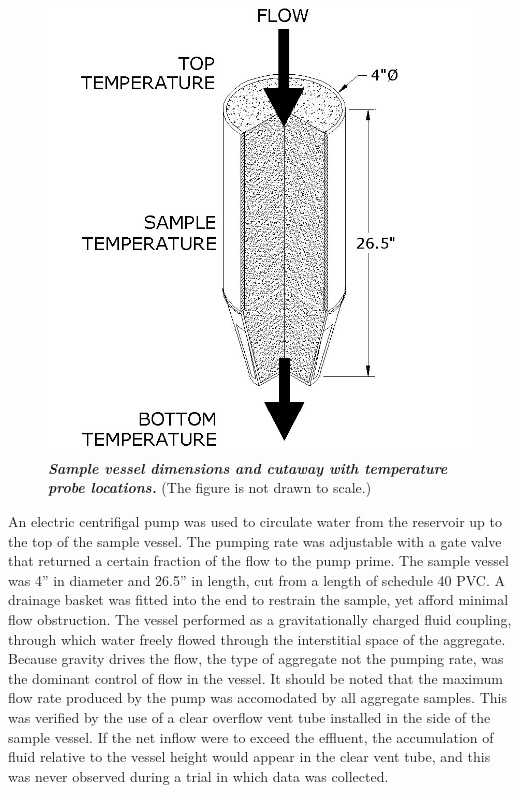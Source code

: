 \documentclass[12pt]{article}
\numberwithin{equation}{section}
\numberwithin{table}{section}
\numberwithin{figure}{section}
\begin{document}
\begin{figure}[h!]
\centering\includegraphics[scale=.35]{isoVessel.jpg}
\caption[Sample Vessel Cross Section]{\textbf{\emph{Sample vessel dimensions and cutaway with temperature probe locations.}} (The figure is not drawn to scale.)\label{isovessel}}
\end{figure}

An electric centrifigal pump was used to circulate water from the reservoir up to the top of the sample vessel. The pumping rate was adjustable with a gate valve that returned a certain fraction of the flow to the pump prime. The sample vessel was 4'' in diameter and 26.5'' in length, cut from a length of schedule 40 PVC. A drainage basket was fitted into the end to restrain the sample, yet afford minimal flow obstruction. The vessel performed as a gravitationally charged fluid coupling, through which water freely flowed through the interstitial space of the aggregate. Because gravity drives the flow, the type of aggregate not the pumping rate, was the dominant control of flow in the vessel. It should be noted that the maximum flow rate produced by the pump was accomodated by all aggregate samples. This was verified by the use of a clear overflow vent tube installed in the side of the sample vessel. If the net inflow were to exceed the effluent, the accumulation of fluid relative to the vessel height would appear in the clear vent tube, and this was never observed during a trial in which data was collected.
\end{document}
